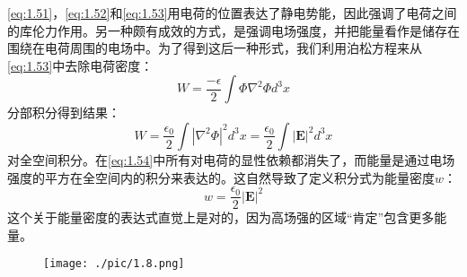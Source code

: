 \documentclass[12pt]{book}
\numberwithin{equation}{chapter}
\numberwithin{figure}{chapter}
\numberwithin{footnote}{page}
\begin{document}
\autoref{eq:1.51}，\autoref{eq:1.52}和\autoref{eq:1.53}用电荷的位置表达了静电势能，因此强调了电荷之间的库伦力作用。另一种颇有成效的方式，是强调电场强度，并把能量看作是储存在围绕在电荷周围的电场中。为了得到这后一种形式，我们利用泊松方程来从\autoref{eq:1.53}中去除电荷密度：
$$W=\frac{-\epsilon}{2}\int \Phi\nabla^2\Phi d^3x$$
分部积分得到结果：
\begin{equation}\label{eq:1.54}
    W=\frac{\epsilon_0}{2}\int |\nabla^2\Phi|^2d^3x=\frac{\epsilon_0}{2}\int |\mathbf{E}|^2 d^3x
\end{equation}
对全空间积分。在\autoref{eq:1.54}中所有对电荷的显性依赖都消失了，而能量是通过电场强度的平方在全空间内的积分来表达的。这自然导致了定义积分式为能量密度$w$：
\begin{equation}\label{eq:1.55}
    w=\frac{\epsilon_0}{2}|\mathbf{E}|^2
\end{equation}
这个关于能量密度的表达式直觉上是对的，因为高场强的区域“肯定”包含更多能量。

\begin{figure}[!ht]
    \centering
    \texttt{[image: ./pic/1.8.png]}
    \captionsetup{justification=raggedright, singlelinecheck=false}
    \caption{}
    \label{fig:1.8}
\end{figure}
\end{document}
